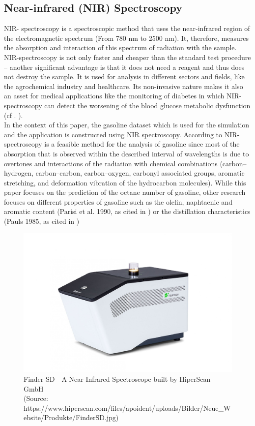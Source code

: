 \documentclass[11pt,twoside,a4paper]{article}
\begin{document}
	\subsection{Near-infrared (NIR) Spectroscopy}
	NIR- spectroscopy is a spectroscopic method that uses the near-infrared region of the electromagnetic spectrum (From 780 nm to 2500 nm). It, therefore, measures the absorption and interaction of this spectrum of radiation with the sample. NIR-spectroscopy is not only faster and cheaper than the standard test procedure – another significant advantage is that it does not need a reagent and thus does not destroy the sample. It is used for analysis in different sectors and fields, like the agrochemical industry and healthcare. Its non-invasive nature makes it also an asset for medical applications like the monitoring of diabetes in which NIR-spectroscopy can detect the worsening of the blood glucose metabolic dysfunction (cf . \cite{FR_li_et_al_2020}). \\
	In the context of this paper, the gasoline dataset which is used for the simulation and the application is constructed using NIR spectroscopy. According to \cite{Bohacs_Ovadi_Salgo1998} NIR-spectroscopy is a feasible method for the analysis of gasoline since most of the absorption that is observed within the described interval of wavelengths is due to overtones and interactions of the radiation with chemical combinations (carbon–hydrogen, carbon–carbon, carbon–oxygen, carbonyl associated groups, aromatic stretching, and deformation vibration of the hydrocarbon molecules). While this paper focuses on the prediction of the octane number of gasoline, other research focuses  on different properties of gasoline such as the olefin, naphtaenic and aromatic content (Parisi et al. 1990, as cited in \cite{Bohacs_Ovadi_Salgo1998}) or the distillation characteristics (Pauls 1985, as cited in \cite{Bohacs_Ovadi_Salgo1998})

	\begin{figure}[H]
		\begin{center}
			\includegraphics[width = \textwidth]{../Graphics/FinderSD.jpg}
			\caption{Finder SD - A Near-Infrared-Spectroscope built by HiperScan GmbH \\
			(Source: https://www.hiperscan.com/files/apoident/uploads/Bilder/Neue\_Website/Produkte/FinderSD.jpg)}
		\end{center}
	\end{figure}
\end{document}
